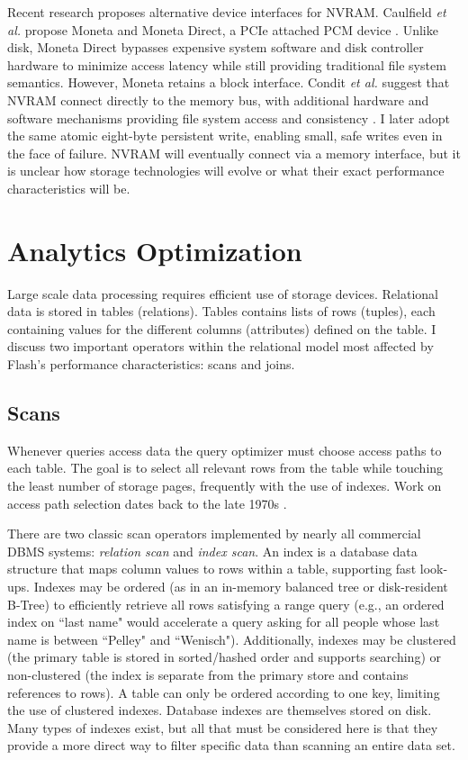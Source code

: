 Recent research proposes alternative device interfaces for NVRAM.
Caulfield \emph{et al.} propose Moneta and Moneta Direct, a PCIe attached PCM device \cite{CaulfieldMollov12}.
Unlike disk, Moneta Direct bypasses expensive system software and disk controller hardware to minimize access latency while still providing traditional file system semantics.
However, Moneta retains a block interface.
Condit \emph{et al.} suggest that NVRAM connect directly to the memory bus, with additional hardware and software mechanisms providing file system access and consistency \cite{ConditNightingale09}.
I later adopt the same atomic eight-byte persistent write, enabling small, safe writes even in the face of failure.
NVRAM will eventually connect via a memory interface, but it is unclear how storage technologies will evolve or what their exact performance characteristics will be.

\section{Analytics Optimization}
\label{sec:Background:Analytics}

Large scale data processing requires efficient use of storage devices.
Relational data is stored in tables (relations).
Tables contains lists of rows (tuples), each containing values for the different columns (attributes) defined on the table.
I discuss two important operators within the relational model most affected by Flash's performance characteristics: scans and joins.

\subsection{Scans}
\label{sec:Background:Scans}

Whenever queries access data the query optimizer must choose access paths to each table. 
The goal is to select all relevant rows from the table while touching the least number of storage pages, frequently with the use of indexes.
Work on access path selection dates back to the late 1970s \cite{Selinger1979}.

There are two classic scan operators implemented by nearly all commercial DBMS systems: \emph{relation scan} and \emph{index scan}.
An index is a database data structure that maps column values to rows within a table, supporting fast look-ups.
Indexes may be ordered (as in an in-memory balanced tree or disk-resident B-Tree) to efficiently retrieve all rows satisfying a range query (e.g., an ordered index on ``last name" would accelerate a query asking for all people whose last name is between ``Pelley" and ``Wenisch").
Additionally, indexes may be clustered (the primary table is stored in sorted/hashed order and supports searching) or non-clustered (the index is separate from the primary store and contains references to rows).
A table can only be ordered according to one key, limiting the use of clustered indexes.
Database indexes are themselves stored on disk.
Many types of indexes exist, but all that must be considered here is that they provide a more direct way to filter specific data than scanning an entire data set.

